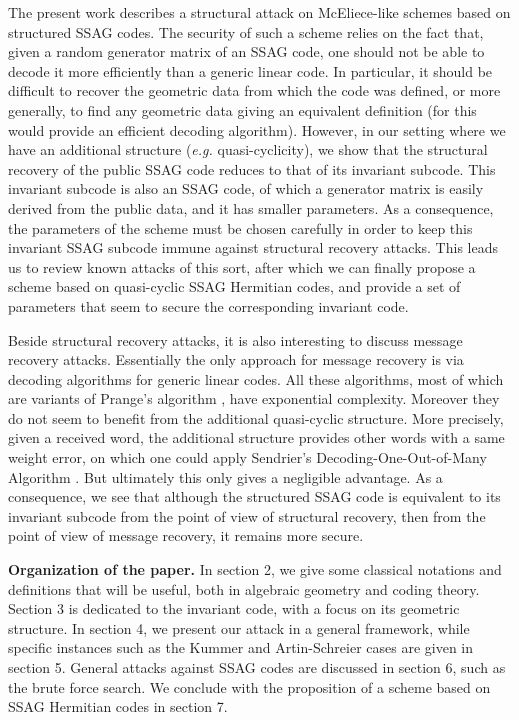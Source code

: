\documentclass[10pt]{article}
\theoremstyle{definition}
\theoremstyle{definition}
\theoremstyle{definition}
\begin{document}
 The present work describes a structural attack on McEliece-like schemes based on structured SSAG codes.
The security of such a scheme relies on the fact that, given a random generator matrix of an SSAG code, one should not be able to decode it more efficiently than a generic linear code.
In particular, it should be difficult to recover the geometric data from which the code was defined, or more generally, to find any geometric data giving an equivalent definition (for this would provide an efficient decoding algorithm).
However, in our setting where we have an additional structure (\textit{e.g.} quasi-cyclicity), we show that the structural recovery of the public SSAG code reduces to that of its invariant subcode.
This invariant subcode is also an SSAG code, of which a generator matrix is easily derived from the public data, and it has smaller parameters.
As a consequence, the parameters of the scheme must be chosen carefully in order to keep this invariant SSAG subcode immune against structural recovery attacks.
This leads us to review known attacks of this sort, after which we can finally propose a scheme based on quasi-cyclic SSAG Hermitian codes, and provide a set of parameters that seem to secure the corresponding invariant code. 



 Beside structural recovery attacks, it is also interesting to discuss message recovery attacks.
Essentially the only approach for message recovery is via decoding algorithms for generic linear codes.
All these algorithms, most of which are variants of Prange's algorithm \cite{PR62}, have exponential complexity. Moreover they do not seem to benefit from the additional quasi-cyclic structure.
More precisely, given a received word, the additional structure provides other words with a same weight error, on which one could apply Sendrier's Decoding-One-Out-of-Many Algorithm \cite{DOOM}.
But ultimately this only gives a negligible advantage.
As a consequence, we see that although the structured SSAG code is equivalent to its invariant subcode from the point of view of structural recovery, then from the point of view of message recovery, it remains more secure.



 \textbf{Organization of the paper.}
In section 2, we give some classical notations and definitions that will be useful, both in algebraic geometry and coding theory. Section 3 is dedicated to the invariant code, with a focus on its geometric structure. In section 4, we present our attack in a general framework, while specific instances such as the Kummer and Artin-Schreier cases are given in section 5. General attacks against SSAG codes are discussed in section 6, such as the brute force search. We conclude with the proposition of a scheme based on SSAG Hermitian codes in section 7.
\end{document}
